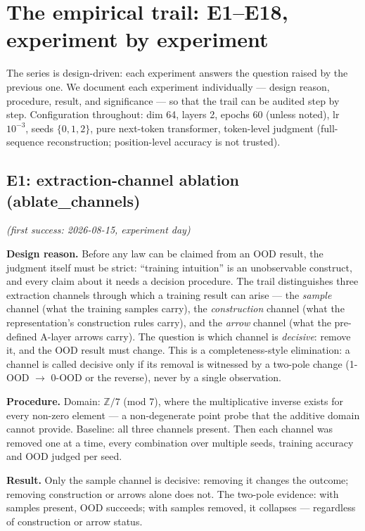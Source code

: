 \documentclass[sigplan,10pt,anonymous,review]{acmart}
\begin{document}
\section{The empirical trail: E1--E18, experiment by experiment}

The series is design-driven: each experiment answers the question raised by
the previous one. We document each experiment individually --- design reason,
procedure, result, and significance --- so that the trail can be audited step
by step. Configuration throughout: dim 64, layers 2, epochs 60 (unless noted),
lr $10^{-3}$, seeds $\{0,1,2\}$, pure next-token transformer, token-level
judgment (full-sequence reconstruction; position-level accuracy is not
trusted).

\subsection{E1: extraction-channel ablation (ablate\_channels)}\hfill\textit{(first success: 2026-08-15, experiment day)}

\textbf{Design reason.} Before any law can be claimed from an OOD result, the
judgment itself must be strict: ``training intuition'' is an unobservable
construct, and every claim about it needs a decision procedure. The trail
distinguishes three extraction channels through which a training result can
arise --- the \emph{sample} channel (what the training samples carry), the
\emph{construction} channel (what the representation's construction rules
carry), and the \emph{arrow} channel (what the pre-defined A-layer arrows
carry). The question is which channel is \emph{decisive}: remove it, and the
OOD result must change. This is a completeness-style elimination: a channel
is called decisive only if its removal is witnessed by a two-pole change
(1-OOD $\to$ 0-OOD or the reverse), never by a single observation.

\textbf{Procedure.} Domain: $\mathbb Z/7$ (mod 7), where the multiplicative
inverse exists for every non-zero element --- a non-degenerate point probe
that the additive domain cannot provide. Baseline: all three channels
present. Then each channel was removed one at a time, every combination over
multiple seeds, training accuracy and OOD judged per seed.

\textbf{Result.} Only the sample channel is decisive: removing it changes
the outcome; removing construction or arrows alone does not. The two-pole
evidence: with samples present, OOD succeeds; with samples removed, it
collapses --- regardless of construction or arrow status.
\end{document}
